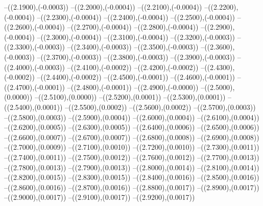 {	--({\sx*(2.1900)},{\sy*(-0.0003)})
	--({\sx*(2.2000)},{\sy*(-0.0004)})
	--({\sx*(2.2100)},{\sy*(-0.0004)})
	--({\sx*(2.2200)},{\sy*(-0.0004)})
	--({\sx*(2.2300)},{\sy*(-0.0004)})
	--({\sx*(2.2400)},{\sy*(-0.0004)})
	--({\sx*(2.2500)},{\sy*(-0.0004)})
	--({\sx*(2.2600)},{\sy*(-0.0004)})
	--({\sx*(2.2700)},{\sy*(-0.0004)})
	--({\sx*(2.2800)},{\sy*(-0.0004)})
	--({\sx*(2.2900)},{\sy*(-0.0004)})
	--({\sx*(2.3000)},{\sy*(-0.0004)})
	--({\sx*(2.3100)},{\sy*(-0.0004)})
	--({\sx*(2.3200)},{\sy*(-0.0003)})
	--({\sx*(2.3300)},{\sy*(-0.0003)})
	--({\sx*(2.3400)},{\sy*(-0.0003)})
	--({\sx*(2.3500)},{\sy*(-0.0003)})
	--({\sx*(2.3600)},{\sy*(-0.0003)})
	--({\sx*(2.3700)},{\sy*(-0.0003)})
	--({\sx*(2.3800)},{\sy*(-0.0003)})
	--({\sx*(2.3900)},{\sy*(-0.0003)})
	--({\sx*(2.4000)},{\sy*(-0.0003)})
	--({\sx*(2.4100)},{\sy*(-0.0002)})
	--({\sx*(2.4200)},{\sy*(-0.0002)})
	--({\sx*(2.4300)},{\sy*(-0.0002)})
	--({\sx*(2.4400)},{\sy*(-0.0002)})
	--({\sx*(2.4500)},{\sy*(-0.0001)})
	--({\sx*(2.4600)},{\sy*(-0.0001)})
	--({\sx*(2.4700)},{\sy*(-0.0001)})
	--({\sx*(2.4800)},{\sy*(-0.0001)})
	--({\sx*(2.4900)},{\sy*(-0.0000)})
	--({\sx*(2.5000)},{\sy*(0.0000)})
	--({\sx*(2.5100)},{\sy*(0.0000)})
	--({\sx*(2.5200)},{\sy*(0.0001)})
	--({\sx*(2.5300)},{\sy*(0.0001)})
	--({\sx*(2.5400)},{\sy*(0.0001)})
	--({\sx*(2.5500)},{\sy*(0.0002)})
	--({\sx*(2.5600)},{\sy*(0.0002)})
	--({\sx*(2.5700)},{\sy*(0.0003)})
	--({\sx*(2.5800)},{\sy*(0.0003)})
	--({\sx*(2.5900)},{\sy*(0.0004)})
	--({\sx*(2.6000)},{\sy*(0.0004)})
	--({\sx*(2.6100)},{\sy*(0.0004)})
	--({\sx*(2.6200)},{\sy*(0.0005)})
	--({\sx*(2.6300)},{\sy*(0.0005)})
	--({\sx*(2.6400)},{\sy*(0.0006)})
	--({\sx*(2.6500)},{\sy*(0.0006)})
	--({\sx*(2.6600)},{\sy*(0.0007)})
	--({\sx*(2.6700)},{\sy*(0.0007)})
	--({\sx*(2.6800)},{\sy*(0.0008)})
	--({\sx*(2.6900)},{\sy*(0.0008)})
	--({\sx*(2.7000)},{\sy*(0.0009)})
	--({\sx*(2.7100)},{\sy*(0.0010)})
	--({\sx*(2.7200)},{\sy*(0.0010)})
	--({\sx*(2.7300)},{\sy*(0.0011)})
	--({\sx*(2.7400)},{\sy*(0.0011)})
	--({\sx*(2.7500)},{\sy*(0.0012)})
	--({\sx*(2.7600)},{\sy*(0.0012)})
	--({\sx*(2.7700)},{\sy*(0.0013)})
	--({\sx*(2.7800)},{\sy*(0.0013)})
	--({\sx*(2.7900)},{\sy*(0.0013)})
	--({\sx*(2.8000)},{\sy*(0.0014)})
	--({\sx*(2.8100)},{\sy*(0.0014)})
	--({\sx*(2.8200)},{\sy*(0.0015)})
	--({\sx*(2.8300)},{\sy*(0.0015)})
	--({\sx*(2.8400)},{\sy*(0.0016)})
	--({\sx*(2.8500)},{\sy*(0.0016)})
	--({\sx*(2.8600)},{\sy*(0.0016)})
	--({\sx*(2.8700)},{\sy*(0.0016)})
	--({\sx*(2.8800)},{\sy*(0.0017)})
	--({\sx*(2.8900)},{\sy*(0.0017)})
	--({\sx*(2.9000)},{\sy*(0.0017)})
	--({\sx*(2.9100)},{\sy*(0.0017)})
	--({\sx*(2.9200)},{\sy*(0.0017)})
}

